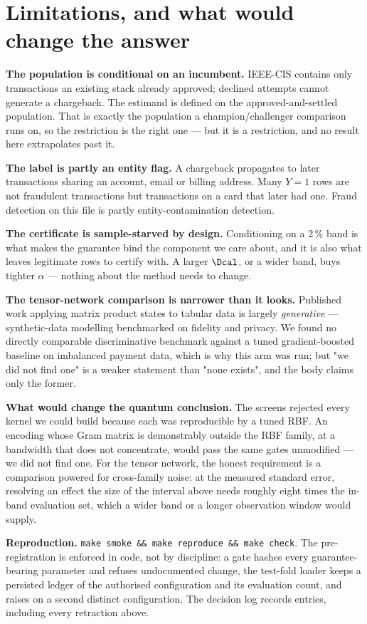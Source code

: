 \section{Limitations, and what would change the answer}

\textbf{The population is conditional on an incumbent.} IEEE-CIS contains only transactions
an existing stack already approved; declined attempts cannot generate a chargeback. The
estimand is defined on the approved-and-settled population. That is exactly the population a
champion/challenger comparison runs on, so the restriction is the right one --- but it is a
restriction, and no result here extrapolates past it.

\textbf{The label is partly an entity flag.} A chargeback propagates to later transactions
sharing an account, email or billing address. Many $Y=1$ rows are not fraudulent
transactions but transactions on a card that later had one. Fraud detection on this file is
partly entity-contamination detection.

\textbf{The certificate is sample-starved by design.} Conditioning on a 2\,\% band is what
makes the guarantee bind the component we care about, and it is also what leaves
\ClaimBandLegitCalMin{} legitimate rows to certify with. A larger $\Dcal$, or a wider band, buys tighter $\alpha$ ---
nothing about the method needs to change.

\textbf{The tensor-network comparison is narrower than it looks.} Published work applying
matrix product states to tabular data is largely \emph{generative} --- synthetic-data
modelling benchmarked on fidelity and privacy. We found no directly comparable discriminative
benchmark against a tuned gradient-boosted baseline on imbalanced payment data, which is why
this arm was run; but "we did not find one" is a weaker statement than "none exists", and the
body claims only the former.

\textbf{What would change the quantum conclusion.} The screens rejected every kernel we could
build because each was reproducible by a tuned RBF. An encoding whose Gram matrix is
demonstrably outside the RBF family, at a bandwidth that does not concentrate, would pass the
same gates unmodified --- we did not find one. For the tensor network, the honest requirement
is a comparison powered for cross-family noise: at the measured standard error, resolving an effect the size of the interval above needs roughly eight times the in-band evaluation set, which a wider band or a
longer observation window would supply.

\medskip\noindent
\textbf{Reproduction.} \texttt{make smoke \&\& make reproduce \&\& make check}. The
pre-registration is enforced in code, not by discipline: a gate hashes every
guarantee-bearing parameter and refuses undocumented change, the test-fold loader keeps a
persisted ledger of the authorised configuration and its evaluation count, and raises on a
second distinct configuration. The decision log records \ClaimDecisionEntries{} entries,
including every retraction above.
